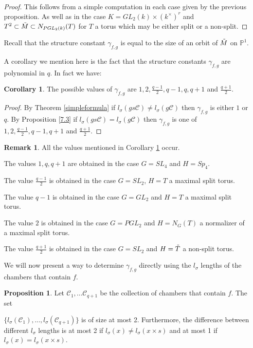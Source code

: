 \documentclass[12pt]{article}
\newcommand{\C}{\mathcal{C}}
\newcommand{\<}{\langle}
\renewcommand{\>}{\rangle}
\theoremstyle{plain}
\theoremstyle{definition}
\newtheorem{prop}[theorem]{Proposition}
\newtheorem{Remark}[theorem]{Remark}
\newtheorem{cor}[theorem]{Corollary}
\begin{document}
        \begin{proof}
            This follows from a simple computation in each case given by the previous proposition. As well as in the case $K=GL_2(k)\times (k^\times)^r$ and $T^2\subset \Tilde{M}\subset N_{PGL_2(k)}(T)$ for $T$ a torus which may be either split or a non-split.
        \end{proof}



Recall that the structure constant $\gamma_{f,g}$ is equal to the size of an orbit of $\Tilde{M}$ on $\mathbb{P}^1$.

A corollary we mention here is the fact that the structure constants $\gamma_{f,g}$ are polynomial in $q$. In fact we have:
\begin{cor}\label{3.21}
The possible values of $\gamma_{f,g}$ are $1,2,\frac{q-1}{2},q-1,q,q+1$ and $\frac{q+1}{2}$.
\end{cor}

\begin{proof}
By Theorem \ref{simpleformula} if $l_\sigma(gs\C)\neq l_\sigma(g\C)$ then $\gamma_{f,g}$ is either $1$ or $q$.
By Proposition \ref{7.3} if $l_\sigma(gs\C)=l_\sigma(g\C)$ then $\gamma_{f,g}$ is one of $1,2,\frac{q-1}{2},q-1,q+1$ and $\frac{q+1}{2}$.
\end{proof}

\begin{Remark}
All the values mentioned in Corollary \ref{3.21} occur.

The values $1,q,q+1$ are obtained in the case $G=SL_4$ and $H=Sp_4$. 

The value $\frac{q-1}{2}$ is obtained in the case $G=SL_2$, $H=T$ a maximal split torus.

The value $q-1$ is obtained in the case $G=GL_2$ and $H=T$ a maximal split torus. 

The value $2$ is obtained in the case $G=PGL_2$ and $H=N_G(T)$ a normalizer of a maximal split torus.

The value $\frac{q+1}{2}$ is obtained in the case $G=SL_2$ and $H=\Tilde{T}$ a non-split torus.
\end{Remark}

 We will now present a way to determine $\gamma_{f,g}$ directly using the $l_\sigma$ lengths of the chambers that contain $f$.

\begin{prop}\label{3.23}
Let $\C_1,...\C_{q+1}$ be the collection of chambers that contain $f$. The set 

$\{l_\sigma(\C_1),...,l_\sigma(\C_{q+1})\}$ is of size at most 2. Furthermore, the difference between different $l_\sigma$ lengths is at most 2 if $l_\sigma(x)\neq l_\sigma(x\times s)$ and at most 1 if $l_\sigma(x)= l_\sigma(x\times s)$.
\end{prop}
\end{document}
